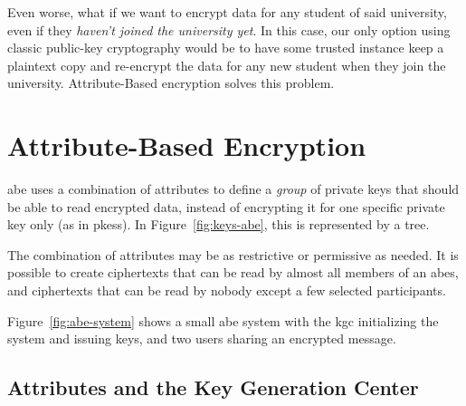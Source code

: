 Even worse, what if we want to encrypt data for any student of said university, even if they \emph{haven't joined the university yet}.
In this case, our only option using classic public-key cryptography would be to have some trusted instance keep a plaintext copy and re-encrypt the data for any new student when they join the university.
Attribute-Based encryption solves this problem.

\section{Attribute-Based Encryption}
\acrfull{abe} uses a combination of attributes to define a \emph{group} of private keys that should be able to read encrypted data, instead of encrypting it for one specific private key only (as in \glspl{pkes}).
In Figure~\ref{fig:keys-abe}, this is represented by a tree.

The combination of attributes may be as restrictive or permissive as needed.
It is possible to create ciphertexts that can be read by almost all members of an \acrshort{abes}, and ciphertexts that can be read by nobody except a few selected participants.

Figure~\ref{fig:abe-system} shows a small \acrshort{abe} system with the \acrshort{kgc} initializing the system and issuing keys, and two users sharing an encrypted message.
\subsection{Attributes and the Key Generation Center}

